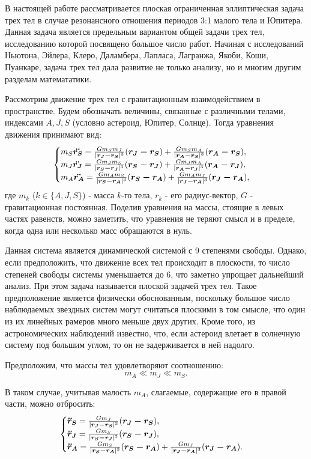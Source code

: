 В настоящей работе рассматривается плоская ограниченная эллиптическая задача трех тел в случае резонансного отношения периодов 3:1 малого тела и Юпитера. Данная задача является предельным вариантом общей задачи трех тел, исследованию которой посвящено большое число работ. Начиная с исследований Ньютона, Эйлера, Клеро, Даламбера, Лапласа, Лагранжа, Якоби, Коши, Пуанкаре, задача трех тел дала развитие не только анализу, но и многим другим разделам математатики. 

Рассмотрим движение трех тел с гравитационным взаимодействием в пространстве. Будем обозначать величины, связанные с различными телами, индексами $A,J,S$ (условно астероид, Юпитер, Солнце). Тогда уравнения движения принимают вид:
\begin{equation*}
 \begin{cases}
   m_S \boldsymbol{\ddot{r_S}} = 
   \frac{G m_S m_J}{|\boldsymbol{r_J-r_S}|^3} (\boldsymbol{r_J-r_S})+
   \frac{G m_S m_A}{|\boldsymbol{r_A-r_S}|^3} (\boldsymbol{r_A-r_S}), 
   \\
   m_J \boldsymbol{\ddot{r_J}} = 
   \frac{G m_J m_S}{|\boldsymbol{r_S-r_J}|^3} (\boldsymbol{r_S-r_J})+
   \frac{G m_J m_A}{|\boldsymbol{r_A-r_J}|^3} (\boldsymbol{r_A-r_J}),
   \\
   m_A \boldsymbol{\ddot{r_A}} = 
   \frac{G m_A m_S}{|\boldsymbol{r_S-r_A}|^3} (\boldsymbol{r_S-r_A})+
   \frac{G m_A m_J}{|\boldsymbol{r_J-r_A}|^3} (\boldsymbol{r_J-r_A}),
 \end{cases}
\end{equation*}
где $m_{k}$ ($k\in \{A, J, S\}$) - масса $k$-го тела, $r_{k}$ - его радиус-вектор, $G$ - гравитационная постоянная. Поделив уравнения на массы, стоящие в левых частях равенств, можно заметить, что уравнения не теряют смысл и в пределе, когда одна или несколько масс обращаются в нуль.

Данная система является динамической системой с 9 степенями свободы. Однако, если предположить, что движение всех тел происходит в плоскости, то число степеней свободы системы уменьшается до 6, что заметно упрощает дальнейший анализ. При этом задача называется плоской задачей трех тел. Такое предположение является физически обоснованным, поскольку большое число наблюдаемых звездных систем могут считаться плоскими в том смысле, что один из их линейных рамеров много меньше двух других. Кроме того, из астрономических наблюдений известно, что, если астероид влетает в солнечную систему под большим углом, то он не задерживается в ней надолго.

Предположим, что массы тел удовлетворяют соотношению: 
$$m_A \ll m_J \ll m_S.$$ 

В таком случае, учитывая малость $m_A$, слагаемые, содержащие его в правой части, можно отбросить:
\begin{equation*}
 \begin{cases}
   \boldsymbol{\ddot{r}_{S}} = 
   \frac{G m_J}{|\boldsymbol{r_J-r_S}|^3} (\boldsymbol{r_J-r_S}),
   \\
   \boldsymbol{\ddot{r}_{J}} = 
   \frac{G m_S}{|\boldsymbol{r_S-r_J}|^3} (\boldsymbol{r_S-r_J}),
   \\
   \boldsymbol{\ddot{r}_{A}} = 
   \frac{G m_S}{|\boldsymbol{r_S-r_A}|^3} (\boldsymbol{r_S-r_A})+
   \frac{G m_J}{|\boldsymbol{r_J-r_A}|^3} (\boldsymbol{r_J-r_A}).
 \end{cases}
\end{equation*}

